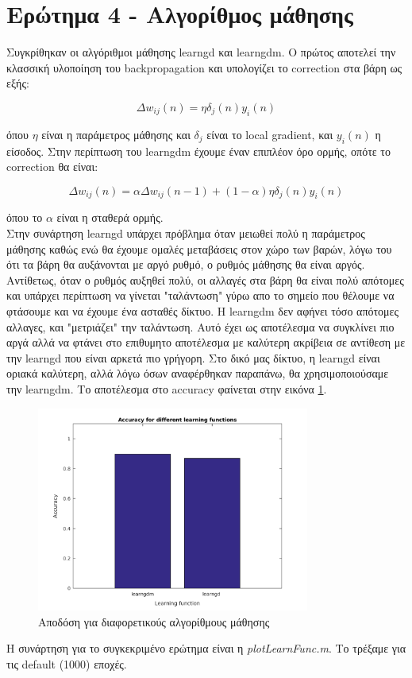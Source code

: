 \documentclass[12pt]{article}
\begin{document}
		
		
		
\section*{Ερώτημα 4 - Αλγορίθμος μάθησης}
Συγκρίθηκαν οι αλγόριθμοι μάθησης learngd και learngdm. Ο πρώτος αποτελεί την κλασσική υλοποίηση του backpropagation και υπολογίζει το correction στα βάρη ως εξής: 

\begin{equation}
\Delta w_{ij}(n)=\eta \delta_{j}(n)y_i(n)
\end{equation}

όπου $\eta$ είναι η παράμετρος μάθησης και  $\delta_{j}$ είναι το local gradient, και $y_i(n)$ η είσοδος. Στην περίπτωση του learngdm έχουμε έναν επιπλέον όρο ορμής, οπότε το correction θα είναι:

\begin{equation}
\Delta w_{ij}(n)=\alpha \Delta w_{ij}(n-1) + (1-\alpha)\eta \delta_{j}(n)y_i(n)
\end{equation}

 όπου το $\alpha$ είναι η σταθερά ορμής. \\
 Στην συνάρτηση learngd υπάρχει πρόβλημα όταν μειωθεί πολύ η παράμετρος μάθησης καθώς ενώ θα έχουμε ομαλές μεταβάσεις στον χώρο των βαρών, λόγω του ότι τα βάρη θα αυξάνονται με αργό ρυθμό, ο ρυθμός μάθησης θα είναι αργός. Αντίθετως, όταν ο ρυθμός αυξηθεί πολύ, οι αλλαγές στα βάρη θα είναι πολύ απότομες και υπάρχει περίπτωση να γίνεται "ταλάντωση" γύρω απο το σημείο που θέλουμε να φτάσουμε και να έχουμε ένα ασταθές δίκτυο. Η learngdm δεν αφήνει τόσο απότομες αλλαγες, και "μετριάζει" την ταλάντωση. Αυτό έχει ως αποτέλεσμα να συγκλίνει πιο αργά αλλά να φτάνει στο επιθυμητο αποτέλεσμα με καλύτερη ακρίβεια σε αντίθεση με την learngd που είναι αρκετά πιο γρήγορη. Στο δικό μας δίκτυο, η learngd είναι οριακά καλύτερη, αλλά λόγω όσων αναφέρθηκαν παραπάνω, θα χρησιμοποιούσαμε την learngdm. Το αποτέλεσμα στο accuracy φαίνεται στην εικόνα \ref{fig:4.Learn-algo}. 

\begin{figure}[H]
	 		\centering
			\includegraphics[width=0.8\textwidth]{fakelos/6b.learnFunc-lvl1-30-lvl2-0.png}
			\caption{Αποδόση για διαφορετικούς αλγορίθμους μάθησης}
			\label{fig:4.Learn-algo}
		\end{figure}
Η συνάρτηση για το συγκεκριμένο ερώτημα είναι η \textit{plotLearnFunc.m}. Το τρέξαμε για τις default (1000) εποχές.
		
\end{document}
